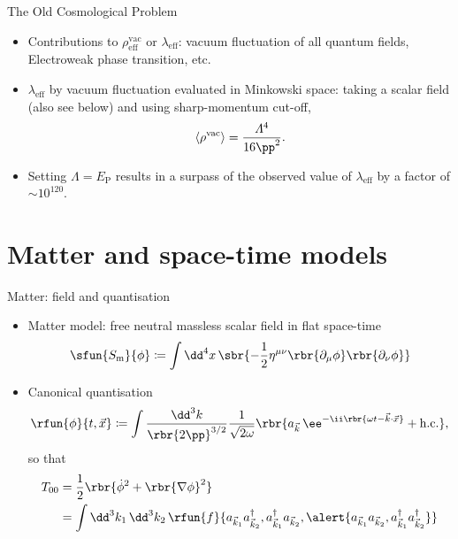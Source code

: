 \documentclass{beamer}
\begin{document}
\begin{frame}{The Old Cosmological Problem}
\begin{itemize}

\item Contributions to $\rho^\text{vac}_\text{eff}$ or $\lambda_\text{eff}$:
vacuum fluctuation of all quantum fields, Electroweak phase transition, etc.

\item $\lambda_\text{eff}$ by vacuum fluctuation evaluated in Minkowski space:
taking a \alert{scalar field} (also see below) and using sharp-momentum cut-off,
\begin{equation}
\left<\rho^\text{vac}\right> = \frac{\varLambda^4}{16\pp^2}.
\end{equation}
\item Setting $\varLambda = E_\text{P}$ results in a surpass of the observed 
value of $\lambda_\text{eff}$ by a factor of $\sim 10^{120}$.

\end{itemize}

\end{frame}

\section{Matter and space-time models}

\begin{frame}{Matter: field and quantisation}

\begin{itemize}
\item Matter model: free neutral massless scalar field in flat space-time
\begin{equation}
\sfun{S_\text{m}}{\phi} \coloneqq \int \dd^4 x\,\sbr{-\frac{1}{2}\eta^{\mu\nu}
\rbr{\partial_\mu \phi}\rbr{\partial_\nu \phi}}
\label{eq:matter-classical}
\end{equation}
\item Canonical quantisation
\begin{equation}
\rfun{\phi}{t,\vec{x}} \coloneqq \int\frac{\dd^3 k}{\rbr{2\pp}^{3/2}} 
\frac{1}{\sqrt{2\omega}}
\rbr{a_{\vec{k}} \,\ee^{-\ii\rbr{\omega t - \vec{k}\cdot\vec{x}}} + 
\text{h.c.}},
\label{eq:matter-quantised}
\end{equation}
so that
\begin{align}
T_{00} &= \frac{1}{2}\rbr{\dot{\phi}^2 + \rbr{\nabla\phi}^2} \\
&= \int\dd^3 k_1\,\dd^3 k_2\,
\rfun{f}{a_{\vec{k}_1} a_{\vec{k}_2}^\dagger, a_{\vec{k}_1}^\dagger 
a_{\vec{k}_2}, \alert{a_{\vec{k}_1} a_{\vec{k}_2}, a_{\vec{k}_1}^\dagger 
a_{\vec{k}_2}^\dagger}}
\end{align}
\end{itemize}


\end{frame}
\end{document}
